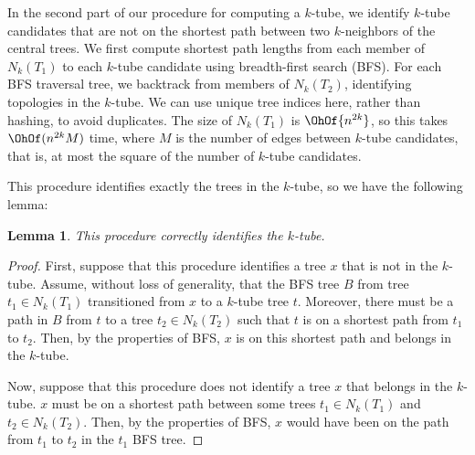 \documentclass{amsart}
\newtheorem{lemma}[theorem]{Lemma}
\begin{document}
In the second part of our procedure for computing a $k$-tube, we identify $k$-tube candidates that are not on the shortest path between two $k$-neighbors of the central trees.
We first compute shortest path lengths from each member of $N_k(T_1)$ to each $k$-tube candidate using breadth-first search (BFS).
For each BFS traversal tree, we backtrack from members of $N_k(T_2)$, identifying topologies in the $k$-tube.
We can use unique tree indices here, rather than hashing, to avoid duplicates.
The size of $N_k(T_1)$ is $\OhOf{n^{2k}}$, so this takes
$\OhOf( n^{2k} M)$ time, where $M$ is the number of edges between $k$-tube candidates, that is, at most the square of the number of $k$-tube candidates. 

This procedure identifies exactly the trees in the $k$-tube, so we have the following lemma:
\begin{lemma}
	\label{lem:k_tube_correctness}
	This procedure correctly identifies the $k$-tube.
\end{lemma}
\begin{proof}
	First, suppose that this procedure identifies a tree $x$ that is not in the $k$-tube.
	Assume, without loss of generality, that the BFS tree $B$ from tree $t_1 \in N_k(T_1)$ transitioned from $x$ to a $k$-tube tree $t$.
	Moreover, there must be a path in $B$ from $t$ to a tree $t_2 \in N_k(T_2)$ such that $t$ is on a shortest path from $t_1$ to $t_2$.
	Then, by the properties of BFS, $x$ is on this shortest path and belongs in the $k$-tube.

	Now, suppose that this procedure does not identify a tree $x$ that belongs in the $k$-tube.
	$x$ must be on a shortest path between some trees $t_1 \in N_k(T_1)$ and $t_2 \in N_k(T_2)$.
	Then, by the properties of BFS, $x$ would have been on the path from $t_1$ to $t_2$ in the $t_1$ BFS tree.
\end{proof}

% 
% 
\end{document}
